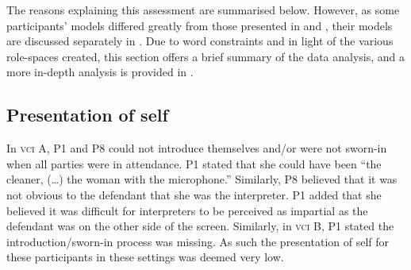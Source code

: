 \documentclass[output=paper]{langsci/langscibook}
\begin{document}
\begin{table}
\caption{Role-space in \textsc{vci} B\label{tab:devaux:3}}
\end{table}

The reasons explaining this assessment are summarised below. However, as some participants’ models differed greatly from those presented in  and , their models are discussed separately in . Due to word constraints and in light of the various role-spaces created, this section offers a brief summary of the data analysis, and a more in-depth analysis is provided in \citet{Devaux2017b}.

\subsection{Presentation of self}
In \textsc{vci} A, P1 and P8 could not introduce themselves and/or were not sworn-in when all parties were in attendance. P1 stated that she could have been “the cleaner, (…) the woman with the microphone.” Similarly, P8 believed that it was not obvious to the defendant that she was the interpreter. P1 added that she believed it was difficult for interpreters to be perceived as impartial as the defendant was on the other side of the screen. Similarly, in \textsc{vci} B, P1 stated the introduction/sworn-in process was missing. As such the presentation of self for these participants in these settings was deemed very low. 
\end{document}
